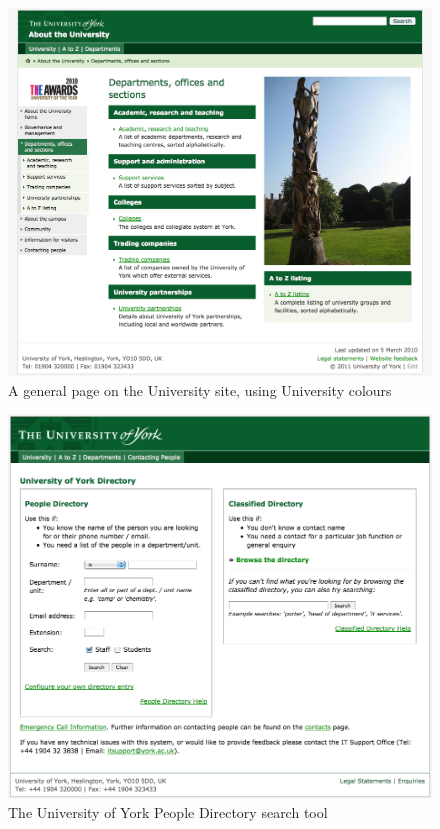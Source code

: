 \documentclass[draft]{scrartcl}
\begin{document}


\begin{figure}
  \begin{center}
    \includegraphics[width=160mm]{images/2011_11_06_yorkacuk.png}
  \end{center}
  \caption{A general page on the University site, using University colours}
  \label{yorkacuk_general_page}
\end{figure}

\begin{figure}
  \begin{center}
    \includegraphics[width=160mm]{images/2011_11_06_yorkacuk_directory.png}
  \end{center}
  \caption{The University of York People Directory search tool}
  \label{yorkacuk_directory_search}
\end{figure}
\end{document}
